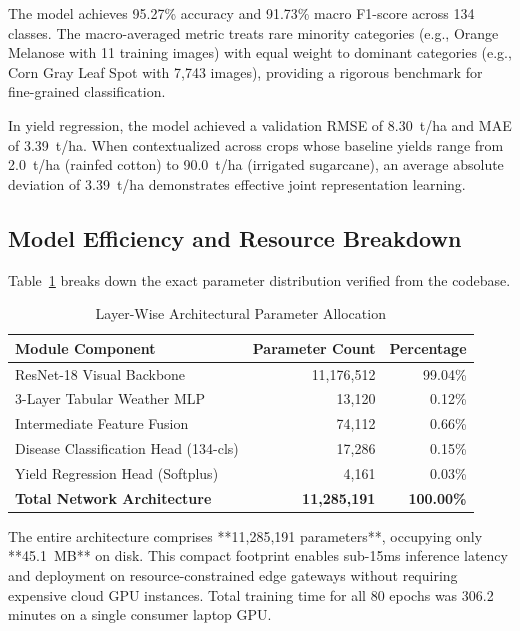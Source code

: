 \documentclass[conference]{IEEEtran}
\begin{document}
The model achieves 95.27\% accuracy and 91.73\% macro F1-score across 134 classes. The macro-averaged metric treats rare minority categories (e.g., Orange Melanose with 11 training images) with equal weight to dominant categories (e.g., Corn Gray Leaf Spot with 7,743 images), providing a rigorous benchmark for fine-grained classification.

In yield regression, the model achieved a validation RMSE of 8.30~t/ha and MAE of 3.39~t/ha. When contextualized across crops whose baseline yields range from 2.0~t/ha (rainfed cotton) to 90.0~t/ha (irrigated sugarcane), an average absolute deviation of 3.39~t/ha demonstrates effective joint representation learning.

\subsection{Model Efficiency and Resource Breakdown}
Table~\ref{tab:param_breakdown} breaks down the exact parameter distribution verified from the codebase.

\begin{table}[t]
\centering
\caption{Layer-Wise Architectural Parameter Allocation}
\label{tab:param_breakdown}
\begin{tabular}{@{}lrr@{}}
\toprule
\textbf{Module Component} & \textbf{Parameter Count} & \textbf{Percentage} \\
\midrule
ResNet-18 Visual Backbone & 11,176,512 & 99.04\% \\
3-Layer Tabular Weather MLP & 13,120 & 0.12\% \\
Intermediate Feature Fusion & 74,112 & 0.66\% \\
Disease Classification Head (134-cls) & 17,286 & 0.15\% \\
Yield Regression Head (Softplus) & 4,161 & 0.03\% \\
\midrule
\textbf{Total Network Architecture} & \textbf{11,285,191} & \textbf{100.00\%} \\
\bottomrule
\end{tabular}
\end{table}

The entire architecture comprises **11,285,191 parameters**, occupying only **45.1~MB** on disk. This compact footprint enables sub-15ms inference latency and deployment on resource-constrained edge gateways without requiring expensive cloud GPU instances. Total training time for all 80 epochs was 306.2 minutes on a single consumer laptop GPU.

\end{document}
